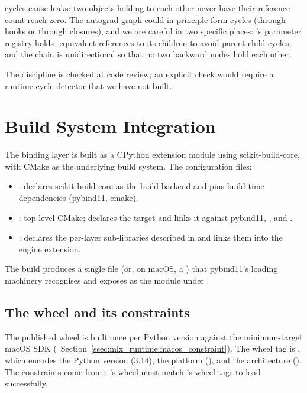  cycles cause leaks: two objects holding
 to each other never have their reference count
reach zero. The autograd graph could in principle form cycles
(through hooks or through closures), and we are careful in two
specific places: 's parameter registry holds
-equivalent references to its children to avoid
parent-child cycles, and the  chain is
unidirectional so that no two backward nodes hold each other.

The discipline is checked at code review; an explicit check would
require a runtime cycle detector that we have not built.

\section{Build System Integration}
\label{sec:python_cpp_binding:build}

The binding layer is built as a CPython extension module using
scikit-build-core, with CMake as the underlying build system. The
configuration files:

\begin{itemize}
  \item {}: declares scikit-build-core as the
    build backend and pins build-time dependencies (pybind11,
    cmake).
  \item {}: top-level CMake; declares the
     target and links it against pybind11, \MLX, and
    \Accelerate.
  \item {}: declares the per-layer
    sub-libraries described in  and links
    them into the engine extension.
\end{itemize}

The build produces a single  file (or, on macOS, a
) that pybind11's loading machinery
recognises and exposes as the  module under
.

\subsection{The wheel and its constraints}
\label{ssec:python_cpp_binding:wheel}

The published wheel is built once per Python version against the
minimum-target macOS SDK
(~Section~\ref{ssec:mlx_runtime:macos_constraint}).
The wheel tag is , which
encodes the Python version (3.14), the platform
(), and the architecture (). The
constraints come from \MLX: \Lucid's wheel must match \MLX's wheel
tags to load successfully.

